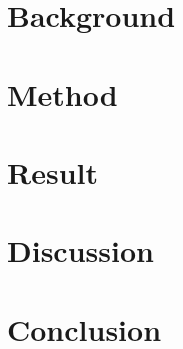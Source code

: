 \documentclass{article}
\begin{document}
\section{Background}\label{background}

\section{Method}\label{method}

 
\section{Result}\label{result}



\section{Discussion}\label{discussion}


\section{Conclusion}\label{conclusion}
\end{document}
